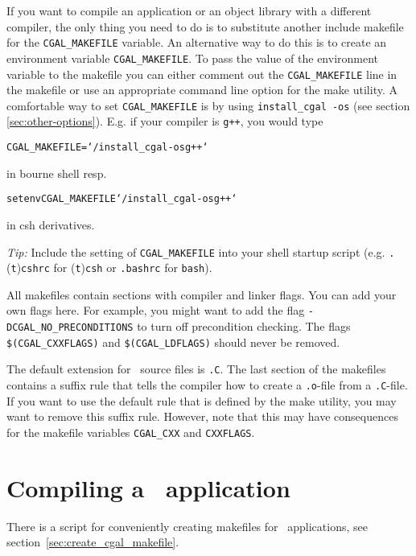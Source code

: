 If you want to compile an application or an object library with a
different compiler, the only thing you need to do is to substitute
another include makefile for the \texttt{CGAL\_MAKEFILE} variable. An
alternative way to do this is to create an environment variable
\texttt{CGAL\_MAKEFILE}. To pass the value of the environment variable
to the makefile you can either comment out the \texttt{CGAL\_MAKEFILE}
line in the makefile or use an appropriate command line option for the
make utility.  A comfortable way to set \texttt{CGAL\_MAKEFILE} is by
using \texttt{install\_cgal~-os} (see section
\ref{sec:other-options}).  E.g. if your compiler is \texttt{g++}, you
would type
\begin{alltt}
CGAL_MAKEFILE=`\yourcgaldir/install_cgal -os g++`
\end{alltt}
in bourne shell resp.
\begin{alltt}
setenv CGAL_MAKEFILE `\yourcgaldir/install_cgal -os g++`
\end{alltt}
in csh derivatives. 

\textit{Tip:} Include the setting of \texttt{CGAL\_MAKEFILE} into your
shell startup script (e.g. \texttt{.}(\texttt{t})\texttt{cshrc} for
(\texttt{t})\texttt{csh} or \texttt{.bashrc} for \texttt{bash}).

All makefiles contain sections with compiler and linker flags.  You
can add your own flags here. For example, you might want to add the
flag \texttt{-DCGAL\_NO\_PRECONDITIONS} to turn off precondition
checking. The flags \texttt{\$(CGAL\_CXXFLAGS)} and
\texttt{\$(CGAL\_LDFLAGS)} should never be removed.

The default extension for \cgal\ source files is \texttt{.C}.  The
last section of the makefiles contains a suffix rule that tells the
compiler how to create a \texttt{.o}-file from a \texttt{.C}-file.  If
you want to use the default rule that is defined by the make utility,
you may want to remove this suffix rule.  However, note that this may
have consequences for the makefile variables \texttt{CGAL\_CXX} and
\texttt{CXXFLAGS}.

\section{Compiling a \cgal\ application}

There is a script for conveniently creating makefiles for \cgal\ applications,
see section~\ref{sec:create_cgal_makefile}.

